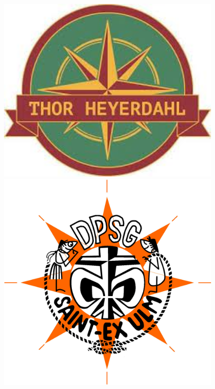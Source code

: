 \begin{titlepage}
\begin{center}
\begin{figure}[h!]
\begin{minipage}{.2\linewidth}
            \end{minipage}%
            \begin{minipage}{.2\linewidth}
                \centering
                \includegraphics[width=1.05\textwidth]{../img/bdp_thor-heyerdahl.jpg}
            \end{minipage}%
            \begin{minipage}{.2\linewidth}
                \centering
                \includegraphics[width=1.2\textwidth]{../img/dpsg_st-exupery.jpg}
            \end{minipage}
        \end{figure}
    \end{center}
\end{titlepage}
